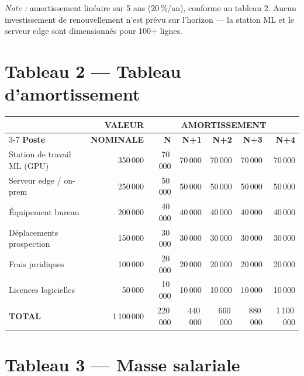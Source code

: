 \documentclass[11pt,a4paper]{article}
\begin{document}
\noindent\textit{Note :} amortissement linéaire sur 5 ans (20\,\%/an), conforme au tableau 2. Aucun investissement de renouvellement n'est prévu sur l'horizon — la station ML et le serveur edge sont dimensionnés pour 100+ lignes.

\section{Tableau 2 — Tableau d'amortissement}

\begin{center}
\small
\begin{longtable}{l r r r r r r}
\toprule
 & \textbf{VALEUR} & \multicolumn{5}{c}{\textbf{AMORTISSEMENT}} \\
\cmidrule(lr){3-7}
\textbf{Poste} & \textbf{NOMINALE} & \textbf{N} & \textbf{N+1} & \textbf{N+2} & \textbf{N+3} & \textbf{N+4} \\
\midrule
\endhead

Station de travail ML (GPU)        & 350\,000 &  70\,000 &  70\,000 &  70\,000 &  70\,000 &  70\,000 \\
Serveur edge / on-prem             & 250\,000 &  50\,000 &  50\,000 &  50\,000 &  50\,000 &  50\,000 \\
Équipement bureau                  & 200\,000 &  40\,000 &  40\,000 &  40\,000 &  40\,000 &  40\,000 \\
Déplacements prospection           & 150\,000 &  30\,000 &  30\,000 &  30\,000 &  30\,000 &  30\,000 \\
Frais juridiques                   & 100\,000 &  20\,000 &  20\,000 &  20\,000 &  20\,000 &  20\,000 \\
Licences logicielles               &  50\,000 &  10\,000 &  10\,000 &  10\,000 &  10\,000 &  10\,000 \\
\midrule
\rowcolor{tabletot}\color{white}\bfseries
TOTAL                              & 1\,100\,000 & 220\,000 & 440\,000 & 660\,000 & 880\,000 & 1\,100\,000 \\
\bottomrule
\end{longtable}
\end{center}

\section{Tableau 3 — Masse salariale}
\end{document}
